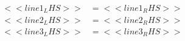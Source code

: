 \noindent{(\theminipagecount)}\quad

\begin{minipage}{0.5\textwidth}
        \begin{align*}
        <<line1_LHS>> &= <<line1_RHS>>\\
        <<line2_LHS>> &= <<line2_RHS>>\\
        <<line3_LHS>> &= <<line3_RHS>>\\
    \end{align*}
\end{minipage}
